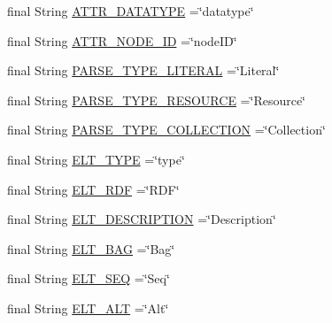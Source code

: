 \begin{DoxyCompactItemize}
\item 
final String \hyperlink{interfaceorg_1_1semanticweb_1_1owlapi_1_1rdf_1_1util_1_1_r_d_f_constants_a9a2c8e7d04c3df414125a70313e7d456}{A\-T\-T\-R\-\_\-\-D\-A\-T\-A\-T\-Y\-P\-E} =\char`\"{}datatype\char`\"{}
\item 
final String \hyperlink{interfaceorg_1_1semanticweb_1_1owlapi_1_1rdf_1_1util_1_1_r_d_f_constants_ad9abe09893de6da316d5795614fac9fb}{A\-T\-T\-R\-\_\-\-N\-O\-D\-E\-\_\-\-I\-D} =\char`\"{}node\-I\-D\char`\"{}
\item 
final String \hyperlink{interfaceorg_1_1semanticweb_1_1owlapi_1_1rdf_1_1util_1_1_r_d_f_constants_a40f3ab45d9e249872909ebebdd0aa88b}{P\-A\-R\-S\-E\-\_\-\-T\-Y\-P\-E\-\_\-\-L\-I\-T\-E\-R\-A\-L} =\char`\"{}Literal\char`\"{}
\item 
final String \hyperlink{interfaceorg_1_1semanticweb_1_1owlapi_1_1rdf_1_1util_1_1_r_d_f_constants_a4765f185e70efd80d3a7a940d8508438}{P\-A\-R\-S\-E\-\_\-\-T\-Y\-P\-E\-\_\-\-R\-E\-S\-O\-U\-R\-C\-E} =\char`\"{}Resource\char`\"{}
\item 
final String \hyperlink{interfaceorg_1_1semanticweb_1_1owlapi_1_1rdf_1_1util_1_1_r_d_f_constants_a1d0e1e589a6bff0c3ab267715353a309}{P\-A\-R\-S\-E\-\_\-\-T\-Y\-P\-E\-\_\-\-C\-O\-L\-L\-E\-C\-T\-I\-O\-N} =\char`\"{}Collection\char`\"{}
\item 
final String \hyperlink{interfaceorg_1_1semanticweb_1_1owlapi_1_1rdf_1_1util_1_1_r_d_f_constants_af4c656379d2e4861ece29cf675dcb6ad}{E\-L\-T\-\_\-\-T\-Y\-P\-E} =\char`\"{}type\char`\"{}
\item 
final String \hyperlink{interfaceorg_1_1semanticweb_1_1owlapi_1_1rdf_1_1util_1_1_r_d_f_constants_a0340bfbf6ff42ca899a3824ef19caa06}{E\-L\-T\-\_\-\-R\-D\-F} =\char`\"{}R\-D\-F\char`\"{}
\item 
final String \hyperlink{interfaceorg_1_1semanticweb_1_1owlapi_1_1rdf_1_1util_1_1_r_d_f_constants_af42d3a8bb50ccf1c3579471030d0adce}{E\-L\-T\-\_\-\-D\-E\-S\-C\-R\-I\-P\-T\-I\-O\-N} =\char`\"{}Description\char`\"{}
\item 
final String \hyperlink{interfaceorg_1_1semanticweb_1_1owlapi_1_1rdf_1_1util_1_1_r_d_f_constants_af5f86ccbb955de1ab9707460de74b1bb}{E\-L\-T\-\_\-\-B\-A\-G} =\char`\"{}Bag\char`\"{}
\item 
final String \hyperlink{interfaceorg_1_1semanticweb_1_1owlapi_1_1rdf_1_1util_1_1_r_d_f_constants_ab84cfc4084ed5ba1ba151e016fe0a80e}{E\-L\-T\-\_\-\-S\-E\-Q} =\char`\"{}Seq\char`\"{}
\item 
final String \hyperlink{interfaceorg_1_1semanticweb_1_1owlapi_1_1rdf_1_1util_1_1_r_d_f_constants_ae459c61b11c7dc6500f172ac3f2cf832}{E\-L\-T\-\_\-\-A\-L\-T} =\char`\"{}Alt\char`\"{}

\end{DoxyCompactItemize}

